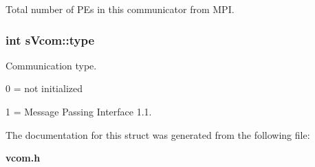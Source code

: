 Total number of PEs in this communicator from MPI. 

\subsubsection[{type}]{\setlength{\rightskip}{0pt plus 5cm}int {\bf sVcom::type}}\label{a00001_a060d49d499bd19965c61974be24423ba}


Communication type. \par
 0 = not initialized \par
 1 = Message Passing Interface 1.1. 



The documentation for this struct was generated from the following file:\begin{DoxyCompactItemize}
\item 
{\bf vcom.h}\end{DoxyCompactItemize}
